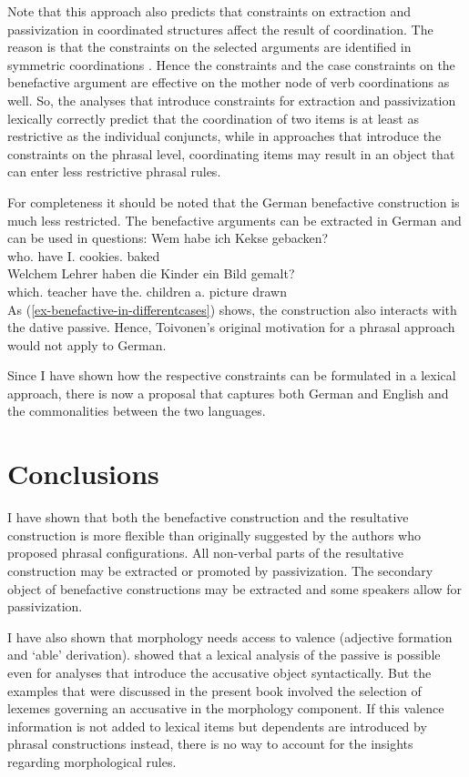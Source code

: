 Note that this approach also predicts that constraints on extraction and passivization in
coordinated structures affect the result of coordination. The reason is that the constraints on the
selected arguments are identified in symmetric coordinations \citep[]{ps2}. Hence the \slasch constraints and the
case constraints on the benefactive argument are effective on the mother node of verb coordinations
as well. So, the analyses that introduce constraints for extraction and passivization lexically
correctly predict that the coordination of two items is at least as restrictive as the individual
conjuncts, while in approaches that introduce the constraints on the phrasal level, coordinating
items may result in an object that can enter less restrictive phrasal rules.


For completeness it should be noted that the German benefactive construction is much less
restricted. The benefactive arguments can be extracted in German and can be used in questions:
\eal
\ex 
\gll Wem habe ich Kekse gebacken?\\
     who.\dat{} have I.\nom{} cookies.\acc{} baked\\
\ex 
\gll Welchem Lehrer haben die Kinder ein Bild gemalt?\\
     which.\dat{} teacher have the.\nom{} children a.\acc{} picture drawn\\
\zl
As (\ref{ex-benefactive-in-differentcases}) shows, the construction also interacts with the dative
passive. Hence, Toivonen's original motivation for a phrasal approach would not apply to
German. 

Since I have shown how the respective constraints can be formulated in a lexical approach,
there is now a proposal that captures both German and English and the commonalities between the two languages.


\chapter{Conclusions}
\label{sec-conclusions}

I have shown that both the benefactive construction and the resultative construction is more
flexible than originally suggested by the authors who proposed phrasal configurations. All
non-verbal parts of the resultative construction may be extracted or promoted by passivization. The
secondary object of benefactive constructions may be extracted and some speakers allow for
passivization.
 
I have also shown that morphology needs access to valence (adjective formation and 
`able' derivation). \citet{Alsina96a} showed that a lexical analysis of the passive is possible even
for analyses that introduce the accusative object syntactically. But the examples that were
discussed in the present book involved the selection of lexemes governing an accusative in the
morphology component. If this valence information is not added to lexical items but dependents are introduced by phrasal
constructions instead, there is no way to account for the insights regarding morphological rules.

